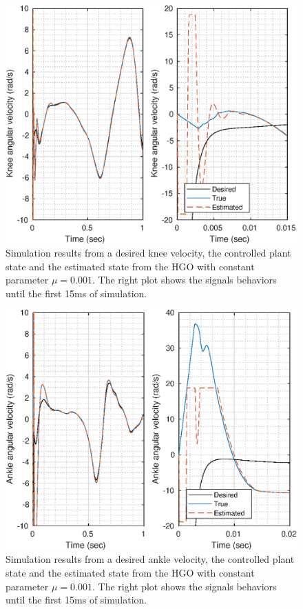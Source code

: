 \documentclass[letterpaper, 10 pt, conference]{ieeeconf}  %
\theoremstyle{plain}
\theoremstyle{definition}
\theoremstyle{remark}
\begin{document}
%
%
\begin{figure}[h!]
	\begin{center}
	\includegraphics[width = \columnwidth]{Figs/dq_knee_mu_1e-03.eps}
	\caption{Simulation results from a desired knee velocity, the controlled plant state and the estimated state from the HGO with constant parameter $\mu=0.001$. The right plot shows the signals behaviors until the first 15ms of simulation.}
	\label{fig:dknee}
	\end{center}
\end{figure}
%
%
\begin{figure}[h!]
	\begin{center}
	\includegraphics[width = \columnwidth]{Figs/dq_ankle_mu_1e-03.eps}
	\caption{Simulation results from a desired ankle velocity, the controlled plant state and the estimated state from the HGO with constant parameter $\mu=0.001$. The right plot shows the signals behaviors until the first 15ms of simulation.}
	\label{fig:dankle}
	\end{center}
\end{figure}
%
\end{document}
